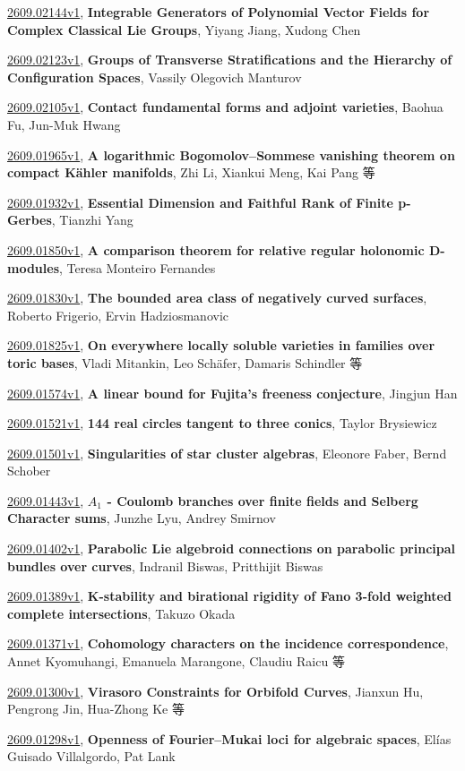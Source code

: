 \documentclass[9pt, a4paper]{article}
\theoremstyle{plain}
\theoremstyle{definition}
\theoremstyle{remark}
\newcommand{\arxiv}[3]{\href{https://arxiv.org/abs/#1}{#1}, \textbf{\textcolor{arxivblue}{#2}}, #3}
\begin{document}
\arxiv{2609.02144v1}{Integrable Generators of Polynomial Vector Fields for Complex Classical Lie Groups}{Yiyang Jiang, Xudong Chen}

\arxiv{2609.02123v1}{Groups of Transverse Stratifications and the Hierarchy of Configuration Spaces}{Vassily Olegovich Manturov}

\arxiv{2609.02105v1}{Contact fundamental forms and adjoint varieties}{Baohua Fu, Jun-Muk Hwang}

\arxiv{2609.01965v1}{A logarithmic Bogomolov--Sommese vanishing theorem on compact Kähler manifolds}{Zhi Li, Xiankui Meng, Kai Pang 等}

\arxiv{2609.01932v1}{Essential Dimension and Faithful Rank of Finite p-Gerbes}{Tianzhi Yang}

\arxiv{2609.01850v1}{A comparison theorem for relative regular holonomic D-modules}{Teresa Monteiro Fernandes}

\arxiv{2609.01830v1}{The bounded area class of negatively curved surfaces}{Roberto Frigerio, Ervin Hadziosmanovic}

\arxiv{2609.01825v1}{On everywhere locally soluble varieties in families over toric bases}{Vladi Mitankin, Leo Schäfer, Damaris Schindler 等}

\arxiv{2609.01574v1}{A linear bound for Fujita's freeness conjecture}{Jingjun Han}

\arxiv{2609.01521v1}{144 real circles tangent to three conics}{Taylor Brysiewicz}

\arxiv{2609.01501v1}{Singularities of star cluster algebras}{Eleonore Faber, Bernd Schober}

\arxiv{2609.01443v1}{$A_1$ - Coulomb branches over finite fields and Selberg Character sums}{Junzhe Lyu, Andrey Smirnov}

\arxiv{2609.01402v1}{Parabolic Lie algebroid connections on parabolic principal bundles over curves}{Indranil Biswas, Pritthijit Biswas}

\arxiv{2609.01389v1}{K-stability and birational rigidity of Fano 3-fold weighted complete intersections}{Takuzo Okada}

\arxiv{2609.01371v1}{Cohomology characters on the incidence correspondence}{Annet Kyomuhangi, Emanuela Marangone, Claudiu Raicu 等}

\arxiv{2609.01300v1}{Virasoro Constraints for Orbifold Curves}{Jianxun Hu, Pengrong Jin, Hua-Zhong Ke 等}

\arxiv{2609.01298v1}{Openness of Fourier--Mukai loci for algebraic spaces}{Elías Guisado Villalgordo, Pat Lank}
\end{document}
